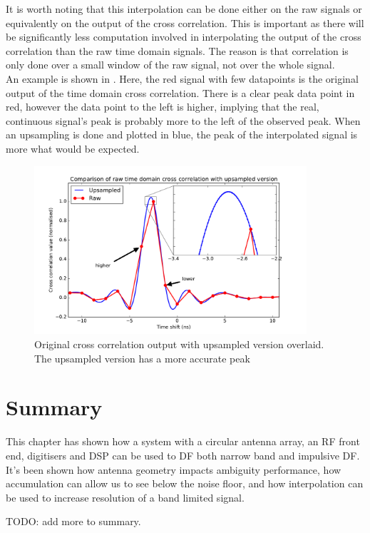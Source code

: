 It is worth noting that this interpolation can be done either on the raw signals or equivalently on the output of the cross correlation. This is important as there will be significantly less computation involved in interpolating the output of the cross correlation than the raw time domain signals. The reason is that correlation is only done over a small window of the raw signal, not over the whole signal.\\

An example is shown in . Here, the red signal with few datapoints is the original output of the time domain cross correlation. There is a clear peak data point in red, however the data point to the left is higher, implying that the real, continuous signal's peak is probably more to the left of the observed peak. When an upsampling is done and plotted in blue, the peak of the interpolated signal is more what would be expected.

\begin{figure}
  \centering
  \includegraphics[width=0.9\textwidth]{time-domain-cross-raw-vs-upped}
  \caption{Original cross correlation output with upsampled version overlaid. The upsampled version has a more accurate peak}
  \label{fig:system-design-raw-vs-upsampled-timedomain}
\end{figure}

\section{Summary}
This chapter has shown how a system with a circular antenna array, an RF front end, digitisers and DSP can be used to DF both narrow band and impulsive DF. It's been shown how antenna geometry impacts ambiguity performance, how accumulation can allow us to see below the noise floor, and how interpolation can be used to increase resolution of a band limited signal.

TODO: add more to summary.
